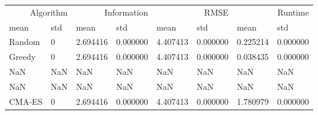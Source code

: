 \begin{tabular}{llllllll}
\toprule
\multicolumn{2}{r}{Algorithm} & \multicolumn{2}{r}{Information} & \multicolumn{2}{r}{RMSE} & \multicolumn{2}{r}{Runtime} \\
mean & std & mean & std & mean & std & mean & std \\
\midrule
Random & 0 & 2.694416 & 0.000000 & 4.407413 & 0.000000 & 0.225214 & 0.000000 \\
Greedy & 0 & 2.694416 & 0.000000 & 4.407413 & 0.000000 & 0.038435 & 0.000000 \\
NaN & NaN & NaN & NaN & NaN & NaN & NaN & NaN \\
NaN & NaN & NaN & NaN & NaN & NaN & NaN & NaN \\
CMA-ES & 0 & 2.694416 & 0.000000 & 4.407413 & 0.000000 & 1.780979 & 0.000000 \\
\bottomrule
\end{tabular}
